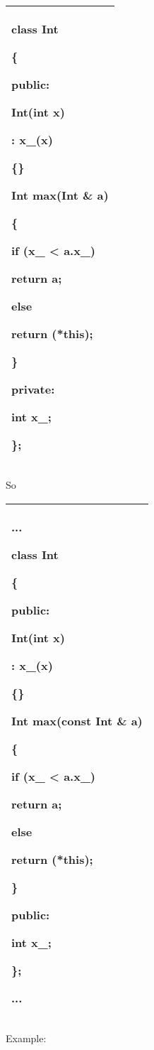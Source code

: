 \documentclass[
]{article}
\begin{document}
\begin{longtable}[]{@{}l@{}}
\toprule
\endhead
\begin{minipage}[t]{0.97\columnwidth}\raggedright
class Int

\{

public:

Int(int x)

: x\_(x)

\{\}

Int max(Int \& a)

\{

if (x\_ \textless{} a.x\_)

return a;

else

return (*this);

\}

private:

int x\_;

\};\strut
\end{minipage}\tabularnewline
\bottomrule
\end{longtable}

So

\begin{longtable}[]{@{}l@{}}
\toprule
\endhead
\begin{minipage}[t]{0.97\columnwidth}\raggedright
...

class Int

\{

public:

Int(int x)

: x\_(x)

\{\}

Int max(\textbf{const} Int \& a)

\{

if (x\_ \textless{} a.x\_)

return a;

else

return (*this);

\}

public:

int x\_;

\};

...\strut
\end{minipage}\tabularnewline
\bottomrule
\end{longtable}

Example:
\end{document}
